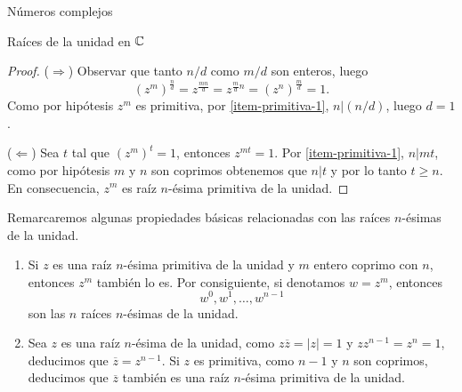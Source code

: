 \begin{chapter}{N\'umeros complejos}
\begin{section}{Raíces de la unidad en $\mathbb C$}
\begin{proof}
            ($\Rightarrow$) Observar que tanto $n/d$ como $m/d$ son enteros, luego
            $$
            (z^m)^{\frac{n}{d}} = z^{\frac{mn}{d}} = z^{\frac{m}{d}n} = (z^n)^{\frac{m}{d}} = 1. 
            $$
            Como por hipótesis $z^m$ es primitiva, por \ref{item-primitiva-1}, $n | (n/d)$, luego $d=1$. 

            ($\Leftarrow$) Sea $t$ tal que $(z^m)^t = 1$,  entonces $z^{mt} =1$. Por \ref{item-primitiva-1}, $n | mt$, como por hipótesis $m$ y $n$ son coprimos obtenemos que $n |t$ y por lo tanto $t \ge n$. En consecuencia, $z^m$  es raíz $n$-ésima primitiva de la unidad. 
        \end{proof}

        \begin{observacion*} Remarcaremos algunas propiedades básicas relacionadas con las raíces $n$-ésimas de la unidad. 
            \begin{enumerate}
                \item Si $z$ es una raíz $n$-ésima primitiva de la unidad y $m$  entero coprimo con $n$, entonces ${z}^m$ también lo es.  Por consiguiente, si denotamos $w = z^m$, entonces 
                $$
                w^0, w^1,\ldots,w^{n-1} 
                $$ 
                son las $n$ raíces $n$-ésimas de la unidad.
                \item Sea $z$ es una raíz $n$-ésima de la unidad, como $z\overline{z} = |z| =1$ y $zz^{n-1} = z^n = 1$,  deducimos que $\overline{z} = z^{n-1}$. Si $z$  es primitiva,  como $n-1$ y $n$ son coprimos, deducimos que $\overline{z}$  también es una raíz $n$-ésima primitiva de la unidad.  
            \end{enumerate}
        \end{observacion*}


        
    \end{section}
\end{chapter}





